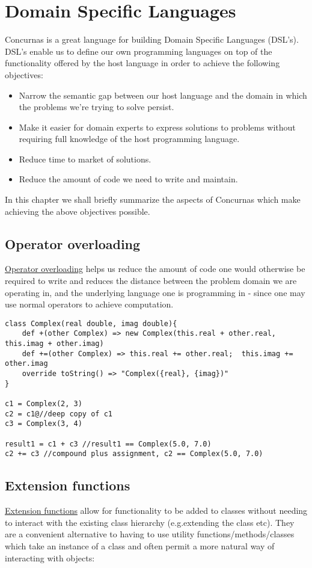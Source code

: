 \documentclass[conc-doc]{subfiles}
\begin{document}
	
	\chapter[DSLs]{Domain Specific Languages}

Concurnas is a great language for building Domain Specific Languages (DSL's). DSL's enable us to define our own programming languages on top of the functionality offered by the host language in order to achieve the following objectives:

\begin{itemize}
	\item Narrow the semantic gap between our host language and the domain in which the problems we're trying to solve persist.
	\item Make it easier for domain experts to express solutions to problems without requiring full knowledge of the host programming language.
	\item Reduce time to market of solutions.
	\item Reduce the amount of code we need to write and maintain.
\end{itemize}

In this chapter we shall briefly summarize the aspects of Concurnas which make achieving the above objectives possible.

\section{Operator overloading}
\hyperref[sec:OperatorOverloading]{Operator overloading} helps us reduce the amount of code one would otherwise be required to write and reduces the distance between the problem domain we are operating in, and the underlying language one is programming in - since one may use normal operators to achieve computation.

\begin{lstlisting}
class Complex(real double, imag double){
	def +(other Complex) => new Complex(this.real + other.real, this.imag + other.imag)
	def +=(other Complex) => this.real += other.real;  this.imag += other.imag
	override toString() => "Complex({real}, {imag})"
}

c1 = Complex(2, 3)
c2 = c1@//deep copy of c1
c3 = Complex(3, 4)

result1 = c1 + c3 //result1 == Complex(5.0, 7.0)
c2 += c3 //compound plus assignment, c2 == Complex(5.0, 7.0)
\end{lstlisting}

\section{Extension functions}
\hyperref[ch:extFuncs]{Extension functions} allow for functionality to be added to classes without needing to interact with the existing class hierarchy (e.g.extending the class etc). They are a convenient alternative to having to use utility functions/methods/classes which take an instance of a class and often permit a more natural way of interacting with objects:
\end{document}
